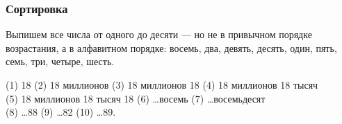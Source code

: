 \begin{frame} \frametitle{Сортировка}

Выпишем все числа от одного до десяти — но не в привычном порядке возрастания, а в алфавитном порядке: восемь, два, девять, десять, один, пять, семь, три, четыре, шесть. \medskip


(1) 18 (2) 18 миллионов (3) 18 миллионов 18 (4) 18 миллионов 18 тысяч \\
(5) 18 миллионов 18 тысяч 18 (6) \ldots восемь (7) \ldots восемьдесят \\
(8) \ldots 88 (9) \ldots 82 (10) \ldots 89.

\end{frame}
